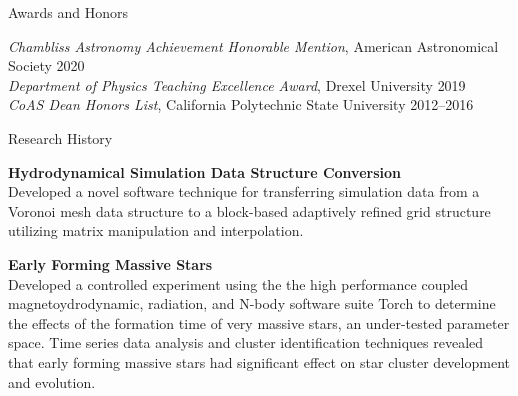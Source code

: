 \documentclass{resume} %
\begin{document}

\begin{rSection}{Awards and Honors}

\textit{Chambliss Astronomy Achievement Honorable Mention}, American Astronomical Society \hfill{2020} \\
\textit{Department of Physics Teaching Excellence Award}, Drexel University \hfill{2019} \\
\textit{CoAS Dean Honors List}, California Polytechnic State University \hfill {2012--2016}

\end{rSection}


\begin{rSection}{Research History}

\begin{description}[leftmargin=8em, style=nextline]

\item[\textnormal{2021-Present}] \textbf{Hydrodynamical Simulation Data Structure Conversion}\\
  Developed a novel software technique for transferring simulation data from a Voronoi mesh data structure to a block-based adaptively refined grid structure utilizing matrix manipulation and interpolation.

\item[\textnormal{2018-Present}] \textbf{Early Forming Massive Stars}\\
  Developed a controlled experiment using the the high performance coupled magnetoydrodynamic, radiation, and N-body software suite Torch to determine the effects of the formation time of very massive stars, an under-tested parameter space.
  Time series data analysis and cluster identification techniques revealed that early forming massive stars had significant effect on star cluster development and evolution.

\end{description}

\end{rSection}

\end{document}
